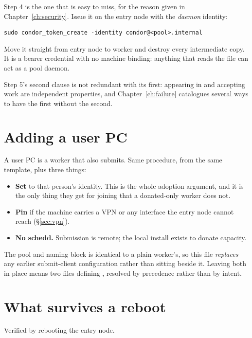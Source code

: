 Step 4 is the one that is easy to miss, for the reason given in
Chapter~\ref{ch:security}. Issue it on the entry node with the \emph{daemon}
identity:

\begin{lstlisting}[style=term]
sudo condor_token_create -identity condor@<pool>.internal
\end{lstlisting}

Move it straight from entry node to worker and destroy every intermediate copy.
It is a bearer credential with no machine binding: anything that reads the file
can act as a pool daemon.

Step 5's second clause is not redundant with its first: appearing in
 and accepting work are independent properties, and
Chapter~\ref{ch:failure} catalogues several ways to have the first without the
second.

\section{Adding a user PC}

A user PC is a worker that also submits. Same procedure, from the same template,
plus three things:

\begin{itemize}
  \item \textbf{Set } to that person's identity. This is the whole
        adoption argument, and it is the only thing they get for joining that a
        donated-only worker does not.
  \item \textbf{Pin } if the machine carries a VPN or
        any interface the entry node cannot reach (\S\ref{sec:vpn}).
  \item \textbf{No schedd.} Submission is remote; the local install exists to
        donate capacity.
\end{itemize}

The pool and naming block is identical to a plain worker's, so this file
\emph{replaces} any earlier submit-client configuration rather than sitting
beside it. Leaving both in place means two files defining
, resolved by  precedence rather than by
intent.

\section{What survives a reboot}

Verified by rebooting the entry node.

